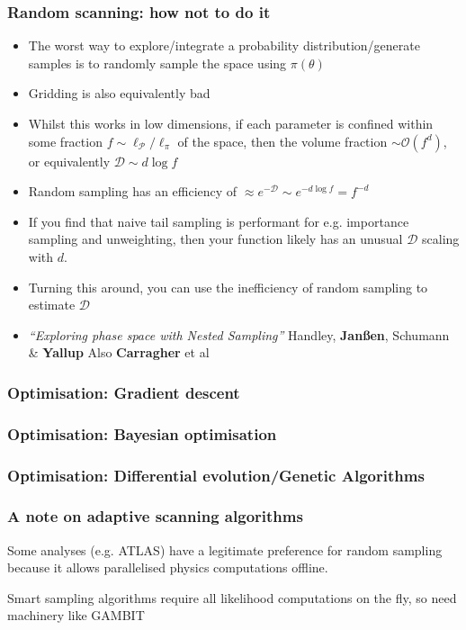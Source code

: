\documentclass[aspectratio=169]{beamer}
\begin{document}
\begin{frame}
    \frametitle{Random scanning: how not to do it}
    \begin{itemize}
        \item The worst way to explore/integrate a probability distribution/generate samples is to randomly sample the space using $\pi(\theta)$~
        \item Gridding is also equivalently bad
        \item Whilst this works in low dimensions, if each parameter is confined within some fraction $f\sim\ell_\mathcal{P}/\ell_\pi$ of the space, then the volume fraction $\sim\mathcal{O}(f^d)$, or equivalently $\mathcal{D}\sim d\log f$ 
        \item Random sampling has an efficiency of $\boxed{\approx e^{-\mathcal{D}} \sim e^{-d\log f} = f^{-d}}$
        \item If you find that naive tail sampling is performant for e.g. importance sampling and unweighting, then your function likely has an unusual $\mathcal{D}$ scaling with $d$. 
        \item Turning this around, you can use the inefficiency of random sampling to estimate $\mathcal{D}$

        \item \emph{``Exploring phase space with Nested Sampling''} Handley, \textbf{Jan{\ss}en}, Schumann \& \textbf{Yallup} 
            Also \textbf{Carragher} et al~
    \end{itemize}
\end{frame}

\begin{frame}
    \frametitle{Optimisation: Gradient descent}
\end{frame}

\begin{frame}
    \frametitle{Optimisation: Bayesian optimisation}
\end{frame}

\begin{frame}
    \frametitle{Optimisation: Differential evolution/Genetic Algorithms}
\end{frame}

\begin{frame}
    \frametitle{A note on adaptive scanning algorithms}
    Some analyses (e.g. ATLAS) have a legitimate preference for random sampling because it allows parallelised physics computations offline.

    Smart sampling algorithms require all likelihood computations on the fly, so need machinery like GAMBIT
\end{frame}
\end{document}
